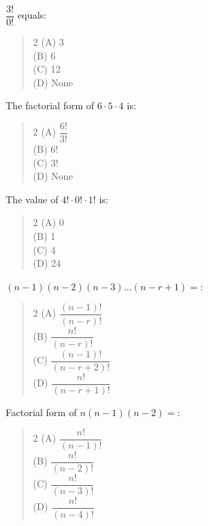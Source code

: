 \documentclass[11pt,a4paper]{article}
\begin{document}
\begin{mcqlist}
\item $\dfrac{3!}{0!}$ equals:
\begin{quote}\begin{multicols}{2}
\noindent (A) 3 \\
(B) 6 \\
(C) 12 \\
(D) None
\end{multicols}\end{quote}

\item The factorial form of $6\cdot5\cdot4$ is:
\begin{quote}\begin{multicols}{2}
\noindent (A) $\dfrac{6!}{3!}$ \\
(B) $6!$ \\
(C) $3!$ \\
(D) None
\end{multicols}\end{quote}

\item The value of $4!\cdot0!\cdot1!$ is:
\begin{quote}\begin{multicols}{2}
\noindent (A) 0 \\
(B) 1 \\
(C) 4 \\
(D) 24
\end{multicols}\end{quote}

\item $(n-1)(n-2)(n-3)\ldots(n-r+1)=$:
\begin{quote}\begin{multicols}{2}
\noindent (A) $\dfrac{(n-1)!}{(n-r)!}$ \\
(B) $\dfrac{n!}{(n-r)!}$ \\
(C) $\dfrac{(n-1)!}{(n-r+2)!}$ \\
(D) $\dfrac{n!}{(n-r+1)!}$
\end{multicols}\end{quote}

\item Factorial form of $n(n-1)(n-2)=$:
\begin{quote}\begin{multicols}{2}
\noindent (A) $\dfrac{n!}{(n-1)!}$ \\
(B) $\dfrac{n!}{(n-2)!}$ \\
(C) $\dfrac{n!}{(n-3)!}$ \\
(D) $\dfrac{n!}{(n-4)!}$
\end{multicols}\end{quote}


\end{mcqlist}
\end{document}
